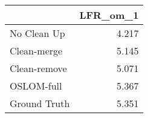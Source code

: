 \begin{tabular}{lr}
\toprule
{} & LFR_om_1 \\
\midrule
No Clean Up  &    4.217 \\
Clean-merge  &    5.145 \\
Clean-remove &    5.071 \\
OSLOM-full   &    5.367 \\
Ground Truth &    5.351 \\
\bottomrule
\end{tabular}
